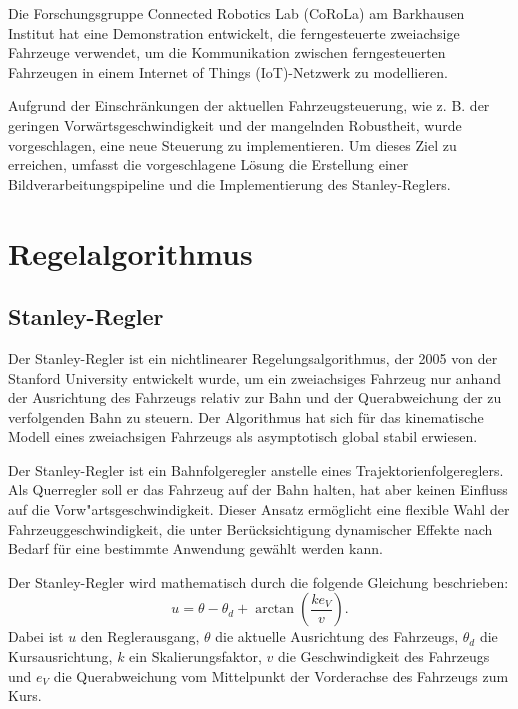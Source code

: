 \documentclass[arbeit=studie,oneside,BCOR=12mm]{ArbeitRST}
\begin{document}
Die Forschungsgruppe Connected Robotics Lab (CoRoLa) am Barkhausen Institut hat
eine Demonstration entwickelt, die ferngesteuerte zweiachsige Fahrzeuge
verwendet, um die Kommunikation zwischen ferngesteuerten Fahrzeugen in einem
Internet of Things (IoT)-Netzwerk zu modellieren.

Aufgrund der Einschränkungen der aktuellen Fahrzeugsteuerung, wie z. B. der
geringen Vorwärtsgeschwindigkeit und der mangelnden Robustheit, wurde
vorgeschlagen, eine neue Steuerung zu implementieren. Um dieses Ziel zu
erreichen, umfasst die vorgeschlagene Lösung die Erstellung einer
Bildverarbeitungspipeline und die Implementierung des Stanley-Reglers.

\chapter{Regelalgorithmus}

\section{Stanley-Regler}

Der Stanley-Regler ist ein nichtlinearer Regelungsalgorithmus, der 2005 von
der Stanford University entwickelt wurde, um ein zweiachsiges Fahrzeug nur
anhand der Ausrichtung des Fahrzeugs relativ zur Bahn und der Querabweichung der zu verfolgenden Bahn zu
steuern. Der Algorithmus hat sich für das kinematische Modell eines
zweiachsigen Fahrzeugs als asymptotisch global stabil erwiesen. \cite{stanley}

Der Stanley-Regler ist ein Bahnfolgeregler anstelle eines
Trajektorienfolgereglers. Als Querregler soll er das Fahrzeug auf der Bahn
halten, hat aber keinen Einfluss auf die Vorw"artsgeschwindigkeit. Dieser
Ansatz ermöglicht eine flexible Wahl der Fahrzeuggeschwindigkeit, die unter
Berücksichtigung dynamischer Effekte nach Bedarf für eine bestimmte Anwendung
gewählt werden kann. \cite{stanley}

Der Stanley-Regler wird mathematisch durch die folgende Gleichung beschrieben:
\begin{equation} 
  u = \theta - \theta_d + \arctan\left(\frac{ke_{V}}{v}\right).
  \label{eq:Stanley-Regler} 
\end{equation}
Dabei ist $u$ den Reglerausgang, $\theta$ die aktuelle Ausrichtung des Fahrzeugs,
$\theta_d$ die Kursausrichtung, $k$ ein Skalierungsfaktor, $v$ die
Geschwindigkeit des Fahrzeugs und $e_{V}$ die Querabweichung vom Mittelpunkt
der Vorderachse des Fahrzeugs zum Kurs.
\end{document}
